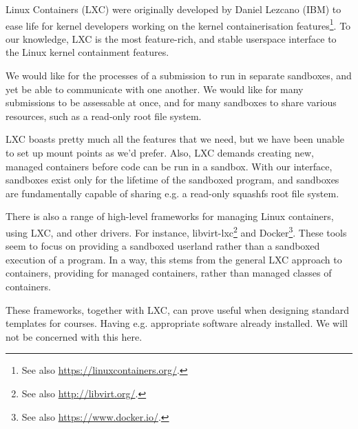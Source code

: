 Linux Containers (LXC) were originally developed by Daniel Lezcano (IBM) to
ease life for kernel developers working on the kernel containerisation
features\footnote{See also \url{https://linuxcontainers.org/}.}. To our
knowledge, LXC is the most feature-rich, and stable userspace interface to the
Linux kernel containment features\cite{graber-2014}.

We would like for the processes of a submission to run in separate sandboxes,
and yet be able to communicate with one another. We would like for many
submissions to be assessable at once, and for many sandboxes to share various
resources, such as a read-only root file system.

LXC boasts pretty much all the features that we need, but we have been unable
to set up mount points as we'd prefer. Also, LXC demands creating new, managed
containers before code can be run in a sandbox. With our interface, sandboxes
exist only for the lifetime of the sandboxed program, and sandboxes are
fundamentally capable of sharing e.g. a read-only squashfs root file system.

There is also a range of high-level frameworks for managing Linux containers,
using LXC, and other drivers. For instance, libvirt-lxc\footnote{See also
\url{http://libvirt.org/}.} and Docker\footnote{See also
\url{https://www.docker.io/}.}. These tools seem to focus on providing a
sandboxed userland rather than a sandboxed execution of a program. In a way,
this stems from the general LXC approach to containers, providing for managed
containers, rather than managed classes of containers.

These frameworks, together with LXC, can prove useful when designing standard
templates for courses. Having e.g. appropriate software already installed. We
will not be concerned with this here.
